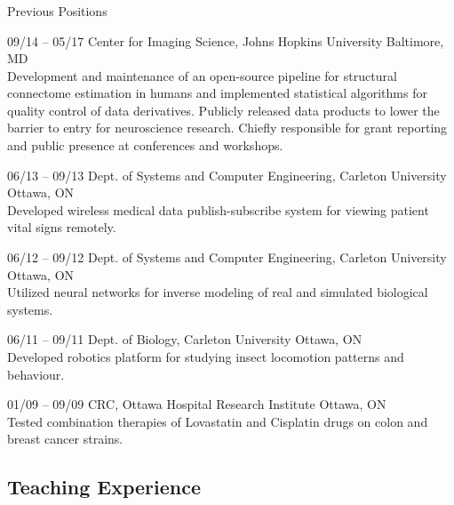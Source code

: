 \documentclass[]{friggeri-cv} %
\begin{document}
\subsubsection{}{Previous Positions}

\begin{entrylist}
\entry
{09/14 -- 05/17}
{Center for Imaging Science, Johns Hopkins University}
{Baltimore, MD}
{\\
Development and maintenance of an open-source pipeline for structural connectome estimation in humans
and implemented statistical algorithms for quality control of data derivatives. Publicly released data
products to lower the barrier to entry for neuroscience research. Chiefly responsible for grant reporting
and public presence at conferences and workshops.}

\entry
{06/13 -- 09/13}
{Dept. of Systems and Computer Engineering, Carleton University}
{Ottawa, ON}
{\\
Developed wireless medical data publish-subscribe system for viewing patient vital signs remotely.}

\entry
{06/12 -- 09/12}
{Dept. of Systems and Computer Engineering, Carleton University}
{Ottawa, ON}
{\\
Utilized neural networks for inverse modeling of real and simulated biological systems.}

\entry
{06/11 -- 09/11}
{Dept. of Biology, Carleton University}
{Ottawa, ON}
{\\
Developed robotics platform for studying insect locomotion patterns and behaviour.}

\entry
{01/09 -- 09/09}
{CRC, Ottawa Hospital Research Institute}
{Ottawa, ON}
{\\
Tested combination therapies of Lovastatin and Cisplatin drugs on colon and breast cancer strains.}
\end{entrylist}

\subsection{Teaching Experience}
\end{document}
